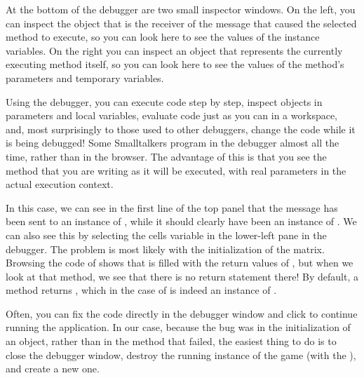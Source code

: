 \documentclass[a4paper,10pt,twoside]{book}
\begin{document}
At the bottom of the debugger are two small inspector windows.
On the left, you can inspect the object that is the receiver of the message that caused the selected method to execute, so you can look here to see the values of the instance variables.
On the right you can inspect an object that represents the currently executing method itself, so you can look here to see the values of the method's parameters and temporary variables.

Using the debugger, you can execute code step by step, inspect objects in parameters and local variables, evaluate code just as you can in a workspace, and, most surprisingly to those used to other debuggers, change the code while it is being debugged!
Some Smalltalkers program in the debugger almost all the time, rather than in the browser.
The advantage of this is that you see the method that you are writing as it will be executed, with real parameters in the actual execution context.

In this case, we can see in the first line of the top panel that the  message has been sent to an instance of , while it should clearly have been an instance of .
We can also see this by selecting the cells variable in the lower-left pane in the debugger.
The problem is most likely with the initialization of the  matrix.
Browsing the code of  shows that  is filled with the return values of , but when we look at that method, we see that there is no return statement there!
By default, a method returns , which in the case of  is indeed an instance of .

\dothis{Close the debugger window.
	Add the expression ``\ct{^ cell}'' to the end of the method \ct{SBEGame>>>newCellAt:at:} so that it returns \ct{cell}.
	(See \mthref{newCellAt:at:nobug}.)}



Often, you can fix the code directly in the debugger window and click  to continue running the application.
In our case, because the bug was in the initialization of an object, rather than in the method that failed, the easiest thing to do is to close the debugger window, destroy the running instance of the game (with the ), and create a new one.
\end{document}
